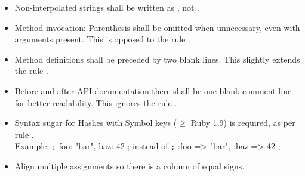 \begin{itemize}
	\item Non-interpolated strings shall be written as , not .

	\item Method invocation: Parenthesis shall be omitted when unnecessary, even with
		arguments present. This is opposed to the rule
		\cite[\href{https://github.com/bbatsov/ruby-style-guide\#method-invocation-parens}{Method~Invocation~Syntax}]{rb:style-guide}.

	\item Method definitions shall be preceded by two blank lines. This slightly
		extends the rule
		\cite[\href{https://github.com/bbatsov/ruby-style-guide\#empty-lines-between-methods}{Source~Code~Layout}]{rb:style-guide}.

	\item Before and after API documentation there shall be one blank comment line for better readability. This ignores
		the rule \cite[\href{https://github.com/bbatsov/ruby-style-guide\#rdoc-conventions}{Source~Code~Layout}]{rb:style-guide}.

	\item Syntax sugar for Hashes with Symbol keys ($\geqslant$ Ruby 1.9)
		is required, as per rule
		\cite[\href{https://github.com/bbatsov/ruby-style-guide\#hash-literals}{Collections}]{rb:style-guide}.\\
		Example: \texttt;{ foo: "bar", baz: 42 }; instead of \texttt;{ :foo => "bar", :baz => 42 };

	\item Align multiple assignments so there is a column of equal signs.
\end{itemize}
